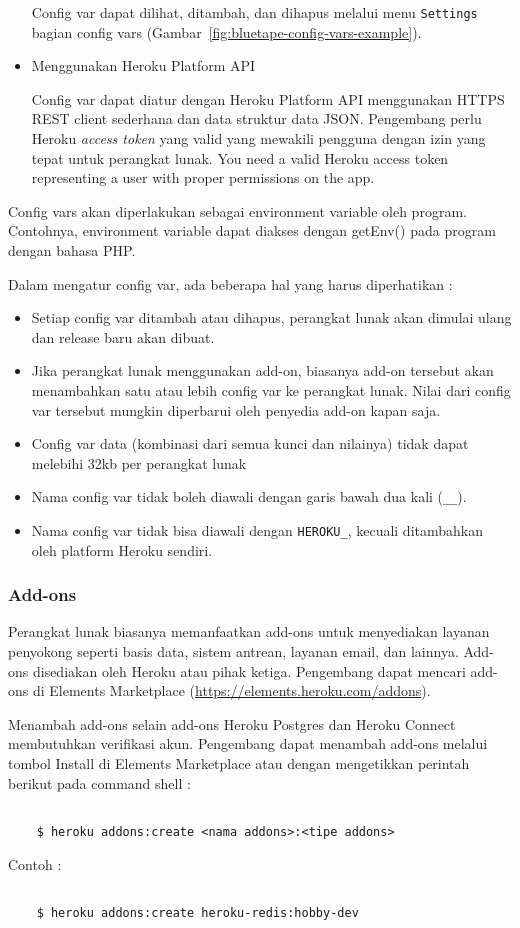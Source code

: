 \begin{itemize}
Config var dapat dilihat, ditambah, dan dihapus melalui menu \texttt{Settings} bagian config vars (Gambar~\ref{fig:bluetape-config-vars-example}).

\item Menggunakan Heroku Platform API

Config var dapat diatur dengan Heroku Platform API menggunakan HTTPS REST client sederhana dan data struktur data JSON. Pengembang perlu Heroku \textit{access token} yang valid yang mewakili pengguna dengan izin yang tepat untuk perangkat lunak.
You need a valid Heroku access token representing a user with proper permissions on the app.

\end{itemize}

Config vars akan diperlakukan sebagai environment variable oleh program. Contohnya, environment variable dapat diakses dengan getEnv() pada program dengan bahasa PHP.
 
Dalam mengatur config var, ada beberapa hal yang harus diperhatikan :
\begin{itemize}
\item Setiap config var ditambah atau dihapus, perangkat lunak akan dimulai ulang dan release baru akan dibuat.
\item Jika perangkat lunak menggunakan add-on, biasanya add-on tersebut akan menambahkan satu atau lebih config var ke perangkat lunak. Nilai dari config var tersebut mungkin diperbarui oleh penyedia add-on kapan saja.
\item Config var data (kombinasi dari semua kunci dan nilainya) tidak dapat melebihi 32kb per perangkat lunak
\item Nama config var tidak boleh diawali dengan garis bawah dua kali (\texttt{\_\_}).
\item Nama config var tidak bisa diawali dengan \texttt{HEROKU\_}, kecuali ditambahkan oleh platform Heroku sendiri.
\end{itemize}

\subsubsection{Add-ons}
Perangkat lunak biasanya memanfaatkan add-ons untuk menyediakan layanan penyokong seperti basis data, sistem antrean, layanan email, dan lainnya. Add-ons disediakan oleh Heroku atau pihak ketiga. Pengembang dapat mencari add-ons di Elements Marketplace (\url{https://elements.heroku.com/addons}). 

Menambah add-ons selain add-ons Heroku Postgres dan Heroku Connect membutuhkan verifikasi akun. Pengembang dapat menambah add-ons melalui tombol Install di Elements Marketplace atau dengan mengetikkan perintah berikut pada command shell :
\begin{lstlisting}

	$ heroku addons:create <nama addons>:<tipe addons>

\end{lstlisting}
Contoh :
\begin{lstlisting}

	$ heroku addons:create heroku-redis:hobby-dev

\end{lstlisting}

